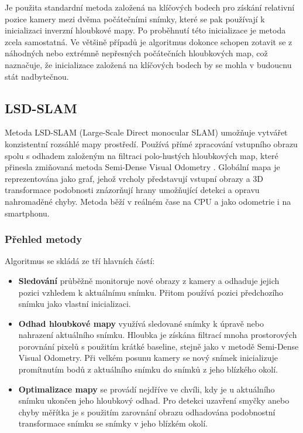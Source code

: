 \documentclass[12pt,a4paper]{article}
\begin{document}
Je použita standardní metoda založená na klíčových bodech pro získání relativní pozice kamery mezi dvěma počátečními snímky, které se pak používají k inicializaci inverzní hloubkové mapy. Po proběhnutí této inicializace je metoda zcela samostatná. Ve většině případů je algoritmus dokonce schopen zotavit se z náhodných nebo extrémně nepřesných počátečních hloubkových map, což naznačuje, že inicializace založená na klíčových bodech by se mohla v budoucnu stát nadbytečnou.

\subsection{LSD-SLAM}
Metoda LSD-SLAM (Large-Scale Direct monocular SLAM) umožňuje vytvářet konzistentní rozsáhlé mapy prostředí. Používá přímé zpracování vstupního obrazu spolu s odhadem založeným na filtraci polo-hustých hloubkových map, které přinesla zmiňovaná metoda Semi-Dense Visual Odometry \cite{Semi-Dense_VO}. Globální mapa je reprezentována jako graf, jehož vrcholy představují vstupní obrazy a 3D transformace podobnosti znázorňují hrany umožňující detekci a opravu nahromaděné chyby. Metoda běží v reálném čase na CPU a jako odometrie i na smartphonu.

\subsubsection*{Přehled metody}
Algoritmus se skládá ze tří hlavních částí:
\begin{itemize}
	\item \textbf{Sledování} průběžně monitoruje nové obrazy z kamery a odhaduje jejich pozici vzhledem k aktuálnímu snímku. Přitom používá pozici předchozího snímku jako vlastní inicializaci. 
	\item \textbf{Odhad hloubkové mapy} využívá sledované snímky k úpravě nebo nahrazení aktuálního snímku. Hloubka je získána filtrací mnoha prostorových porovnání pixelů s použitím krátké baseline, stejně jako v metodě Semi-Dense Visual Odometry. Při velkém posunu kamery se nový snímek inicializuje promítnutím bodů z aktuálního snímku do snímků z jeho blízkého okolí. 
	\item \textbf{Optimalizace mapy} se provádí nejdříve ve chvíli, kdy je u aktuálního snímku ukončen jeho hloubkový odhad. Pro detekci uzavření smyčky anebo chyby měřítka je s použitím zarovnání obrazu odhadována podobnostní transformace snímku se snímky v jeho blízkém okolí.
\end{itemize}
\end{document}
